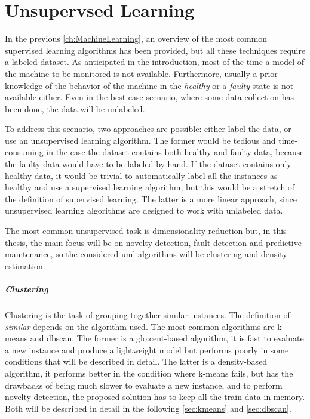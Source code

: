 \chapter{Unsupervsed Learning}
\label{ch:Unsupervised}

In the previous \autoref{ch:MachineLearning}, an overview of the most common supervised learning algorithms has been provided, but all these techniques require a labeled dataset. As anticipated in the introduction, most of the time a model of the machine to be monitored is not available. Furthermore, usually a prior knowledge of the behavior of the machine in the \emph{healthy} or a \emph{faulty} state is not available either. Even in the best case scenario, where some data collection has been done, the data will be unlabeled. 

To address this scenario, two approaches are possible: either label the data, or use an unsupervised learning algorithm. The former would be tedious and time-consuming in the case the dataset contains both healthy and faulty data, because the faulty data would have to be labeled by hand. If the dataset contains only healthy data, it would be trivial to automatically label all the instances as healthy and use a supervised learning algorithm, but this would be a stretch of the definition of supervised learning. The latter is a more linear approach, since unsupervised learning algorithms are designed to work with unlabeled data.

The most common unsupervised task is dimensionality reduction  but, in this thesis, the main focus will be on novelty detection, fault detection and predictive maintenance, so the considered \gls{uml} algorithms will be clustering and density estimation.

\paragraph[]{Clustering}
Clustering is the task of grouping together similar instances. The definition of \emph{similar} depends on the algorithm used. The most common algorithms are {k-means} and \gls{dbscan}. The former is a \gls{glo:cent}-based algorithm, it is fast to evaluate a new instance and produce a lightweight model but performs poorly in some conditions that will be described in detail. The latter is a density-based algorithm, it performs better in the condition where k-means fails, but has the drawbacks of being much slower to evaluate a new instance, and to perform novelty detection, the proposed solution has to keep all the train data in memory. Both will be described in detail in the following \autoref{sec:kmeans} and \autoref{sec:dbscan}.

